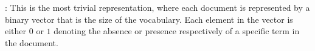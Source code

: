 
 : This is the most trivial representation, where each document is represented by a binary vector that is the size of the vocabulary. Each element in the vector is either $0$ or $1$ denoting the absence or presence respectively of a specific term in the document.

